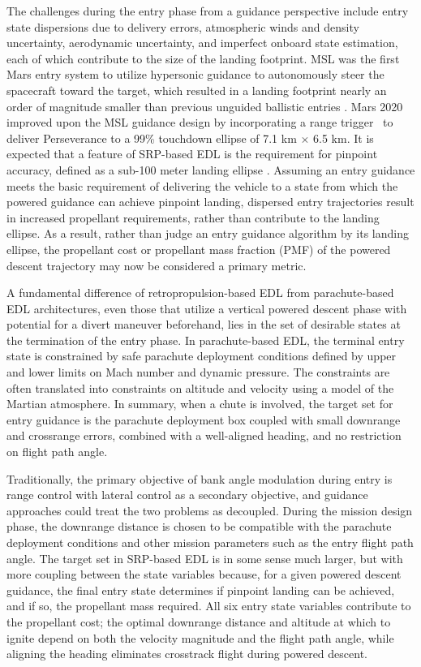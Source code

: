 The challenges during the entry phase from a guidance perspective include entry state dispersions due to delivery errors, atmospheric winds and density uncertainty, aerodynamic uncertainty, and imperfect onboard state estimation, each of which contribute to the size of the landing footprint. MSL was the first Mars entry system to utilize hypersonic guidance to autonomously steer the spacecraft toward the target, which resulted in a landing footprint nearly an order of magnitude smaller than previous unguided ballistic entries \cite{BraunMarsEDL}. Mars 2020 improved upon the MSL guidance design by incorporating a range trigger~\cite{TriggerComparison2020} to deliver Perseverance to a 99\% touchdown ellipse of 7.1 km $\times$ 6.5 km. 
It is expected that a feature of SRP-based EDL is the requirement for pinpoint accuracy, defined as a sub-100 meter landing ellipse \cite{GNC_Pinpoint}. Assuming an entry guidance meets the basic requirement of delivering the vehicle to a state from which the powered guidance can achieve pinpoint landing, dispersed entry trajectories result in increased propellant requirements, rather than contribute to the landing ellipse. As a result, rather than judge an entry guidance algorithm by its landing ellipse, the propellant cost or propellant mass fraction (PMF) of the powered descent trajectory may now be considered a primary metric.

A fundamental difference of retropropulsion-based EDL from parachute-based EDL architectures, even those that utilize a vertical powered descent phase with potential for a divert maneuver beforehand, lies in the set of desirable states at the termination of the entry phase. In parachute-based EDL, the terminal entry state is constrained by safe parachute deployment conditions defined by upper and lower limits on Mach number and dynamic pressure. The constraints are often translated into constraints on altitude and velocity using a model of the Martian atmosphere. In summary, when a chute is involved, the target set for entry guidance is the parachute deployment box coupled with small downrange and crossrange errors, combined with a well-aligned heading, and no restriction on flight path angle. 

Traditionally, the primary objective of bank angle modulation during entry is range control with lateral control as a secondary objective, and guidance approaches could treat the two problems as decoupled. During the mission design phase, the downrange distance is chosen to be compatible with the parachute deployment conditions and other mission parameters such as the entry flight path angle. The target set in SRP-based EDL is in some sense much larger, but with more coupling between the state variables because, for a given powered descent guidance, the final entry state determines if pinpoint landing can be achieved, and if so, the propellant mass required. All six entry state variables contribute to the propellant cost; the optimal downrange distance and altitude at which to ignite depend on both the velocity magnitude and the flight path angle, while aligning the heading eliminates crosstrack flight during powered descent. 

